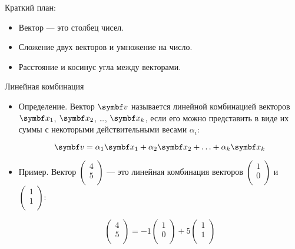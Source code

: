 
\begin{frame} %


\end{frame}



\begin{frame}{Краткий план:}
  \begin{itemize}[<+->]
    \item Вектор — это столбец чисел.
    \item Сложение двух векторов и умножение на число.
    \item Расстояние и косинус угла между векторами.
  \end{itemize}

\end{frame}


\begin{frame}{Линейная комбинация}

\begin{itemize}[<+->]
  \item Определение. Вектор $\bv$ называется \alert{линейной комбинацией} векторов $\bx_1$, $\bx_2$, \ldots, $\bx_k$, 
если его можно представить в виде их суммы с некоторыми действительными весами $\alpha_i$:

\[
  \bv = \alpha_1 \bx_1 + \alpha_2 \bx_2 + \ldots + \alpha_k \bx_k
\]

\item Пример. Вектор $\begin{pmatrix}
  4 \\
  5 \\
\end{pmatrix}$ — это линейная комбинация векторов $\begin{pmatrix}
  1 \\
  0 \\
\end{pmatrix}$ и $\begin{pmatrix}
  1 \\
  1 \\
\end{pmatrix}$:

\[
\begin{pmatrix}
  4 \\
  5 \\
\end{pmatrix} = -1 \begin{pmatrix}
  1 \\
  0 \\
\end{pmatrix} + 5 \begin{pmatrix}
  1 \\
  1 \\
\end{pmatrix}  
\]


\end{itemize}


\end{frame}



